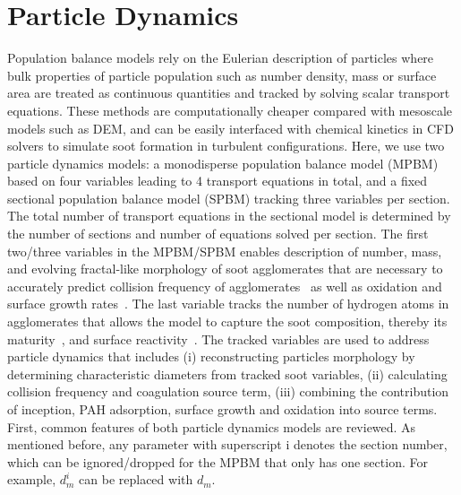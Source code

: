 \section{Particle Dynamics}
Population balance models rely on the Eulerian description of particles where bulk properties of particle population such as number density, mass or surface area are treated as continuous quantities and tracked by solving scalar transport equations. These methods are computationally cheaper compared with mesoscale models such as DEM, and can be easily interfaced with chemical kinetics in CFD solvers to simulate soot formation in turbulent configurations. Here, we use two particle dynamics models: a monodisperse population balance model (MPBM) based on four variables leading to 4 transport equations in total, and a fixed sectional population balance model (SPBM) tracking three variables per section. The total number of transport equations in the sectional model is determined by the number of sections and number of equations solved per section. The first two/three variables in the MPBM/SPBM enables description of number, mass, and evolving fractal-like morphology of soot agglomerates that are necessary to accurately predict collision frequency of agglomerates~\citep{mulholland1988cluster} as well as oxidation and surface growth rates~\citep{kelesidis2019estimating}. The last variable tracks the number of hydrogen atoms in agglomerates that allows the model to capture the soot composition, thereby its maturity~\citep{kholghy2016core}, and surface reactivity~\citep{blanquart2009analyzing}.  
The tracked variables are used to address particle dynamics that includes (i) reconstructing particles morphology by determining characteristic diameters from tracked soot variables, (ii) calculating collision frequency and coagulation source term, (iii) combining the contribution of inception, PAH adsorption, surface growth and oxidation into source terms.
First, common features of both particle dynamics models are reviewed. As mentioned before, any parameter with superscript i denotes the section number, which can be ignored/dropped for the MPBM that only has one section. For example, ${d^i_m}$ can be replaced with ${d_m}$.

